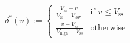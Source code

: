 \begin{equation}
	\delta^{*}(v) := 
	\begin{cases} 
		\frac{V_\text{ss} - v}{V_\text{ss} - V_\text{low}} & \text{if } v \leq V_\text{ss} \\
		\frac{v - V_\text{ss}}{V_\text{high} - V_\text{ss}} & \text{otherwise}
	\end{cases}
	\label{ch4:equ:metric-voltage-scaling}
\end{equation}
